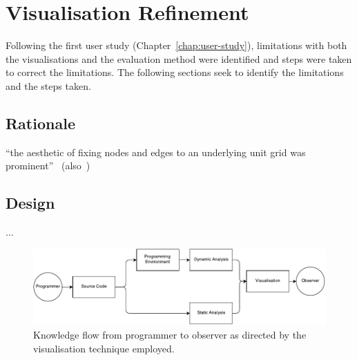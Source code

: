 
\chapter{Visualisation Refinement}
\label{chap:visualisation-refinement}

Following the first user study (Chapter~\ref{chap:user-study}), limitations with both the visualisations and the evaluation method were identified and steps were taken to correct the limitations. The following sections seek to identify the limitations and the steps taken.

\section{Rationale}

``the aesthetic of fixing nodes and edges to an underlying unit grid was prominent''~\cite{Purchase2014} (also~\cite{Purchase2001,Purchase1996})

\section{Design}

\cite{Purchase1996}...

\begin{figure}
  \centering \includegraphics[width=\columnwidth]{../images/diagrams/knowledge-flow-refined.pdf}
  \caption{Knowledge flow from programmer to observer as directed by the visualisation technique employed.}
\label{fig:knowledge-flow-refined}
\end{figure}

